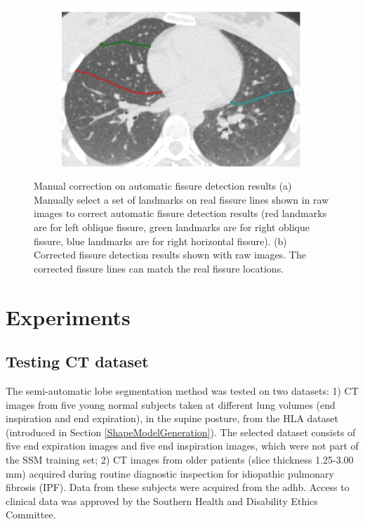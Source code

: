 {\begin{figure}[htbp]
\begin{subfigure}{.44\linewidth}
  \includegraphics[width=\linewidth,trim={{.0\wd0} {.0\wd0} {.0\wd0} {.0\wd0}},clip]{Segmentation/Image/AfterManualCorrection.png}
  \caption{}
  \label{fig:ManualCorrection-b} 
\end{subfigure}
\caption{Manual correction on automatic fissure detection results (a) Manually select a set of landmarks on real fissure lines shown in raw images to correct automatic fissure detection results (red landmarks are for left oblique fissure, green landmarks are for right oblique fissure, blue landmarks are for right horizontal fissure). (b) Corrected fissure detection results shown with raw images. The corrected fissure lines can match the real fissure locations.}
\label{fig:ManualCorrection}
\end{figure}

\section{Experiments} \label{SegmentationExperiment}

\subsection{Testing CT dataset}
The semi-automatic lobe segmentation method was tested on two datasets: 1) CT images from five young normal subjects taken at different lung volumes (end inspiration and end expiration), in the supine posture, from the HLA dataset (introduced in Section \ref{ShapeModelGeneration}). The selected dataset consists of five end expiration images and five end inspiration images, which were not part of the SSM training set; 2) CT images from older patients (slice thickness 1.25-3.00 mm) acquired during routine diagnostic inspection for idiopathic pulmonary fibrosis (IPF). Data from these subjects were acquired from the \gls{adhb}. Access to clinical data was approved by the Southern Health and Disability Ethics Committee. 

}
